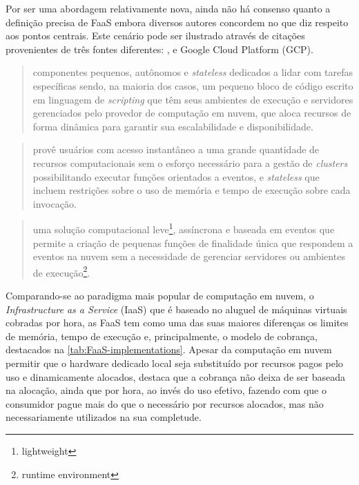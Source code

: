 \documentclass[english,brazilian]{UNISINOSmonografia} %
\begin{document}
Por ser uma abordagem relativamente nova, ainda não há consenso quanto a definição precisa de FaaS embora diversos autores concordem no que diz respeito aos pontos centrais.
Este cenário pode ser ilustrado através de citações provenientes de três fontes diferentes: ,  e Google Cloud Platform (GCP).
\begin{quote}
	componentes pequenos, autônomos e \textit{stateless} dedicados a lidar com tarefas específicas sendo, na maioria dos casos, um pequeno bloco de código escrito em linguagem de \textit{scripting} que têm seus ambientes de execução e servidores gerenciados pelo provedor de computação em nuvem, que aloca recursos de forma dinâmica para garantir sua escalabilidade e disponibilidade.
	\cite{Wang2018}
\end{quote}
\begin{quote}
	provê usuários com acesso instantâneo a uma grande quantidade de recursos computacionais sem o esforço necessário para a gestão de \textit{clusters} possibilitando executar funções orientados a eventos, e \textit{stateless} que incluem restrições sobre o uso de memória e tempo de execução sobre cada invocação.
	\cite{Shankar2018}
\end{quote}
\begin{quote}
	uma solução computacional leve\footnote{lightweight}, assíncrona e baseada em eventos que permite a criação de pequenas funções de finalidade única que respondem a eventos na nuvem sem a necessidade de gerenciar servidores ou ambientes de execução\footnote{runtime environment}.
	\cite{GCP-FaaS}
	
\end{quote}


Comparando-se ao paradigma mais popular de computação em nuvem, o \textit{Infrastructure as a Service} (IaaS) que é baseado no aluguel de máquinas virtuais cobradas por hora, as FaaS tem como uma das suas maiores diferenças os limites de memória, tempo de execução e, principalmente, o modelo de cobrança, destacados na \autoref{tab:FaaS-implementations}. 
Apesar da computação em nuvem permitir que o hardware dedicado local seja substituído por recursos pagos pelo uso e dinamicamente alocados,  destaca que a cobrança não deixa de ser baseada na alocação, ainda que por hora, ao invés do uso efetivo, fazendo com que o consumidor pague mais do que o necessário por recursos alocados, mas não necessariamente utilizados na sua completude.
\end{document}

